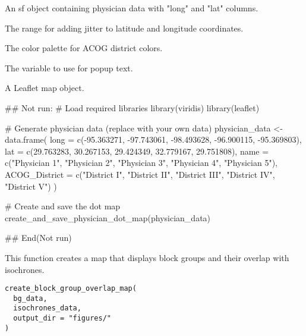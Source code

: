 \documentclass[a4paper]{book}
\begin{document}
%
\begin{Arguments}
\begin{ldescription}
\item[\code{physician\_data}] An sf object containing physician data with "long" and "lat" columns.

\item[\code{jitter\_range}] The range for adding jitter to latitude and longitude coordinates.

\item[\code{color\_palette}] The color palette for ACOG district colors.

\item[\code{popup\_var}] The variable to use for popup text.
\end{ldescription}
\end{Arguments}
%
\begin{Value}
A Leaflet map object.
\end{Value}
%
\begin{Examples}
\begin{ExampleCode}
## Not run: 
# Load required libraries
library(viridis)
library(leaflet)

# Generate physician data (replace with your own data)
physician_data <- data.frame(
  long = c(-95.363271, -97.743061, -98.493628, -96.900115, -95.369803),
  lat = c(29.763283, 30.267153, 29.424349, 32.779167, 29.751808),
  name = c("Physician 1", "Physician 2", "Physician 3", "Physician 4", "Physician 5"),
  ACOG_District = c("District I", "District II", "District III", "District IV", "District V")
)

# Create and save the dot map
create_and_save_physician_dot_map(physician_data)

## End(Not run)

\end{ExampleCode}
\end{Examples}
%
\begin{Description}
This function creates a map that displays block groups and their overlap with isochrones.
\end{Description}
%
\begin{Usage}
\begin{verbatim}
create_block_group_overlap_map(
  bg_data,
  isochrones_data,
  output_dir = "figures/"
)
\end{verbatim}
\end{Usage}
\end{document}
